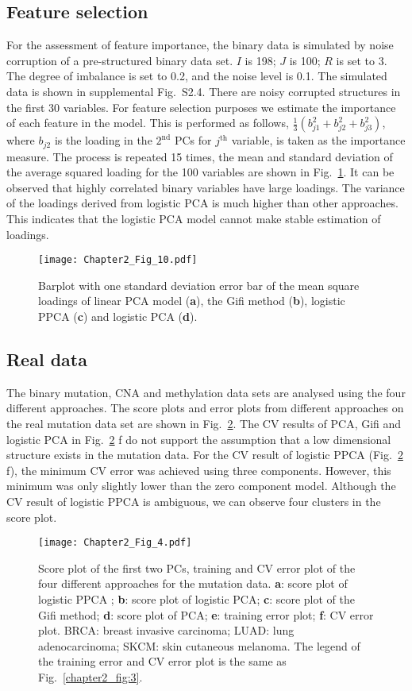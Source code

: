 \subsection{Feature selection}
For the assessment of feature importance, the binary data is simulated by noise corruption of a pre-structured binary data set. $I$ is 198; $J$ is 100; $R$ is set to 3. The degree of imbalance is set to 0.2, and the noise level is 0.1. The simulated data is shown in supplemental Fig.~S2.4. There are noisy corrupted structures in the first 30 variables. For feature selection purposes we estimate the importance of each feature in the model. This is performed as follows, $\frac{1}{3}(b_{j1}^2+b_{j2}^2+ b_{j3}^2)$, where $b_{j2}$ is the loading in the $2^{\text{nd}}$ PCs for $j^{\text{th}}$ variable, is taken as the importance measure. The process is repeated 15 times, the mean and standard deviation of the average squared loading for the 100 variables are shown in Fig.~\ref{chapter2_fig:5}. It can be observed that highly correlated binary variables have large loadings. The variance of the loadings derived from logistic PCA is much higher than other approaches. This indicates that the logistic PCA model cannot make stable estimation of loadings.
\begin{figure}[htbp]
    \centering
    \texttt{[image: Chapter2\_Fig\_10.pdf]}
    \caption{Barplot with one standard deviation error bar of the mean square loadings of linear PCA model (\textbf{a}), the Gifi method (\textbf{b}), logistic PPCA (\textbf{c}) and logistic PCA (\textbf{d}).}
    \label{chapter2_fig:5}
\end{figure}

\subsection{Real data}
The binary mutation, CNA and methylation data sets are analysed using the four different approaches. The score plots and error plots from different approaches on the real mutation data set are shown in Fig.~\ref{chapter2_fig:6}. The CV results of PCA, Gifi and logistic PCA in Fig.~\ref{chapter2_fig:6} f do not support the assumption that a low dimensional structure exists in the mutation data. For the CV result of logistic PPCA (Fig.~\ref{chapter2_fig:6} f), the minimum CV error was achieved using three components. However, this minimum was only slightly lower than the zero component model. Although the CV result of logistic PPCA is ambiguous, we can observe four clusters in the score plot.
\begin{figure}[htbp]
    \centering
    \texttt{[image: Chapter2\_Fig\_4.pdf]}
    \caption{Score plot of the first two PCs, training and CV error plot of the four different approaches for the mutation data. \textbf{a}: score plot of logistic PPCA ; \textbf{b}: score plot of logistic PCA; \textbf{c}: score plot of the Gifi method; \textbf{d}: score plot of PCA; \textbf{e}: training error plot; \textbf{f}: CV error plot. BRCA: breast invasive carcinoma; LUAD: lung adenocarcinoma; SKCM: skin cutaneous melanoma. The legend of the training error and CV error plot is the same as Fig.~\ref{chapter2_fig:3}.}
    \label{chapter2_fig:6}
\end{figure}

